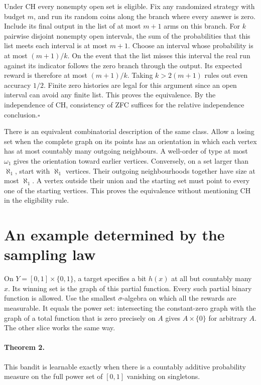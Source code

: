 \documentclass[11pt]{article}
\begin{document}
Under CH every nonempty open set is eligible. Fix any randomized strategy with budget $m$, and run its random coins along the branch where every answer is zero. Include its final output in the list of at most $m+1$ arms on this branch. For $k$ pairwise disjoint nonempty open intervals, the sum of the probabilities that this list meets each interval is at most $m+1$. Choose an interval whose probability is at most $(m+1)/k$. On the event that the list misses this interval the real run against its indicator follows the zero branch through the output. Its expected reward is therefore at most $(m+1)/k$. Taking $k>2(m+1)$ rules out even accuracy $1/2$. Finite zero histories are legal for this argument since an open interval can avoid any finite list. This proves the equivalence. By the independence of CH, consistency of ZFC suffices for the relative independence conclusion.\hfill$\square$

There is an equivalent combinatorial description of the same class. Allow a losing set when the complete graph on its points has an orientation in which each vertex has at most countably many outgoing neighbours. A well-order of type at most $\omega_1$ gives the orientation toward earlier vertices. Conversely, on a set larger than $\aleph_1$, start with $\aleph_1$ vertices. Their outgoing neighbourhoods together have size at most $\aleph_1$. A vertex outside their union and the starting set must point to every one of the starting vertices. This proves the equivalence without mentioning CH in the eligibility rule.

\section{An example determined by the sampling law}
On $Y=[0,1]\times\{0,1\}$, a target specifies a bit $h(x)$ at all but countably many $x$. Its winning set is the graph of this partial function. Every such partial binary function is allowed. Use the smallest $\sigma$-algebra on which all the rewards are measurable. It equals the power set: intersecting the constant-zero graph with the graph of a total function that is zero precisely on $A$ gives $A\times\{0\}$ for arbitrary $A$. The other slice works the same way.

\paragraph{Theorem 2.} This bandit is learnable exactly when there is a countably additive probability measure on the full power set of $[0,1]$ vanishing on singletons.
\end{document}
